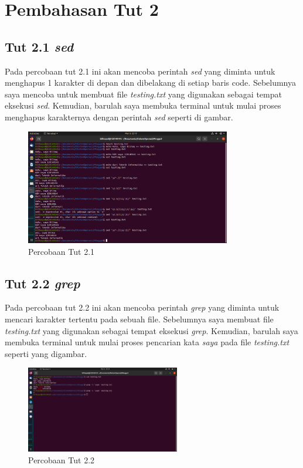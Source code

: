 \documentclass[11pt,a4paper]{article}
\begin{document}
\newpage
\section{Pembahasan Tut 2}
\subsection{Tut 2.1 \textit{sed}}
	Pada percobaan tut 2.1 ini akan mencoba perintah \textit{sed} yang diminta untuk menghapus 1 karakter di depan dan dibelakang
	di setiap baris code. Sebelumnya saya mencoba untuk membuat file \textit{testing.txt} yang digunakan sebagai tempat eksekusi \textit{sed}.
	Kemudian, barulah saya membuka terminal untuk mulai proses menghapus karakternya dengan perintah \textit{sed} seperti di gambar.
	\begin{figure}[h]
		\centering
		\includegraphics[width=0.8\textwidth]{Figure/tut 2.1.png}
		\caption{Percobaan Tut 2.1}
	\end{figure}

\subsection{Tut 2.2 \textit{grep}}
	Pada percobaan tut 2.2 ini akan mencoba perintah \textit{grep} yang diminta untuk mencari karakter tertentu pada sebuah file.
	Sebelumnya saya membuat file \textit{testing.txt} yang digunakan sebagai tempat eksekusi \textit{grep}. Kemudian, barulah saya membuka terminal 
	untuk mulai proses pencarian kata \textit{saya} pada file \textit{testing.txt} seperti yang digambar.
	\begin{figure}[h]
		\centering
		\includegraphics[width=0.6\textwidth]{Figure/tut 2.2.png}
		\caption{Percobaan Tut 2.2}
	\end{figure}
\end{document}
